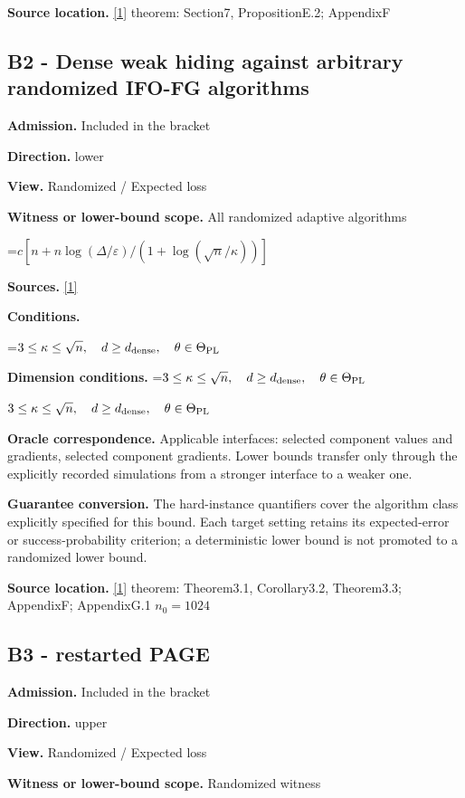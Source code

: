 \documentclass[10pt,a4paper]{article}
\newcommand{\AtlasMath}[1]{\par\begingroup\centering\setbox0=\hbox{$\displaystyle #1$}\ifdim\wd0>1.4\linewidth\typeout{ATLAS WIDE FORMULA: \the\wd0}\fi\ifdim\wd0>\linewidth\resizebox{\linewidth}{!}{\box0}\else\box0\fi\par\endgroup}
\newcommand{\AtlasInlineMath}[1]{\begingroup\setbox0=\hbox{$#1$}\ifdim\wd0>.4\linewidth\endgroup\AtlasMath{#1}\else\endgroup$#1$\fi}
\begin{document}
\textbf{Source location.} \href{https://arxiv.org/pdf/2609.00045v3}{[1]} theorem: Section7, PropositionE.2; AppendixF

\subsection{B2 - Dense weak hiding against arbitrary randomized IFO-FG algorithms}
\textbf{Admission.} Included in the bracket

\textbf{Direction.} lower

\textbf{View.} Randomized / Expected loss

\textbf{Witness or lower-bound scope.} All randomized adaptive algorithms

\AtlasMath{c[n+n\log(\Delta/\varepsilon)/(1+\log(\sqrt n/\kappa))]}
\textbf{Sources.} \href{https://arxiv.org/pdf/2609.00045v3}{[1]}

\textbf{Conditions.} 
\AtlasMath{3\le\kappa\le\sqrt n,\quad d\ge d_{\rm dense},\quad\theta\in\Theta_{\rm PL}}


\textbf{Dimension conditions.} \AtlasInlineMath{3\le\kappa\le\sqrt n,\quad d\ge d_{\rm dense},\quad\theta\in\Theta_{\rm PL}}

\textbf{Oracle correspondence.} Applicable interfaces: selected component values and gradients, selected component gradients. Lower bounds transfer only through the explicitly recorded simulations from a stronger interface to a weaker one.

\textbf{Guarantee conversion.} The hard-instance quantifiers cover the algorithm class explicitly specified for this bound. Each target setting retains its expected-error or success-probability criterion; a deterministic lower bound is not promoted to a randomized lower bound.

\textbf{Source location.} \href{https://arxiv.org/pdf/2609.00045v3}{[1]} theorem: Theorem3.1, Corollary3.2, Theorem3.3; AppendixF; AppendixG.1 $n_0=1024$

\subsection{B3 - restarted PAGE}
\textbf{Admission.} Included in the bracket

\textbf{Direction.} upper

\textbf{View.} Randomized / Expected loss

\textbf{Witness or lower-bound scope.} Randomized witness
\end{document}
